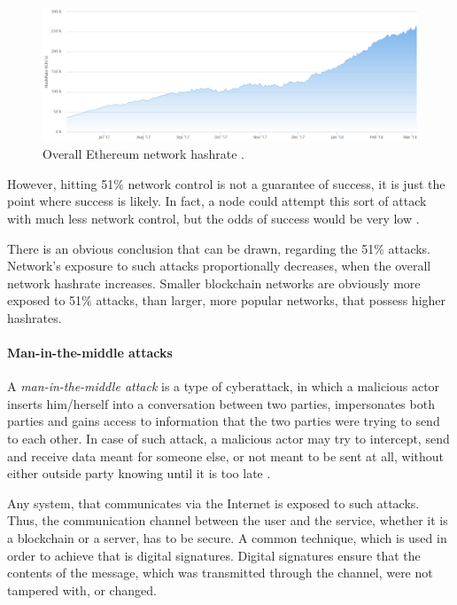 \begin{figure}[H]
\centering
\includegraphics[scale=0.49]{images/ethereumhashrate.png}
\caption{Overall Ethereum network hashrate \textnormal{\citep{ethhashrate}}.}
\label{fig:ethereumhashrate}
\end{figure}

However, hitting 51\% network control is not a guarantee of success, it is just the point where success is likely. In fact, a node could attempt this sort of attack with much less network control, but the odds of success would be very low \citep{51perattack}. 

There is an obvious conclusion that can be drawn, regarding the 51\% attacks. Network's exposure to such attacks proportionally decreases, when the overall network hashrate increases. Smaller blockchain networks are obviously more exposed to 51\% attacks, than larger, more popular networks, that possess higher hashrates.

\paragraph{Man-in-the-middle attacks}
A \textit{\gls{man-in-the-middle attack}} is a type of cyberattack, in which a malicious actor inserts him/herself into a conversation between two parties, impersonates both parties and gains access to information that the two parties were trying to send to each other. In case of such attack, a malicious actor may try to intercept, send and receive data meant for someone else, or not meant to be sent at all, without either outside party knowing until it is too late \citep{mitm}.

Any system, that communicates via the Internet is exposed to such attacks. Thus, the communication channel between the user and the service, whether it is a blockchain or a server, has to be secure. A common technique, which is used in order to achieve that is digital signatures. Digital signatures ensure that the contents of the message, which was transmitted through the channel, were not tampered with, or changed.

